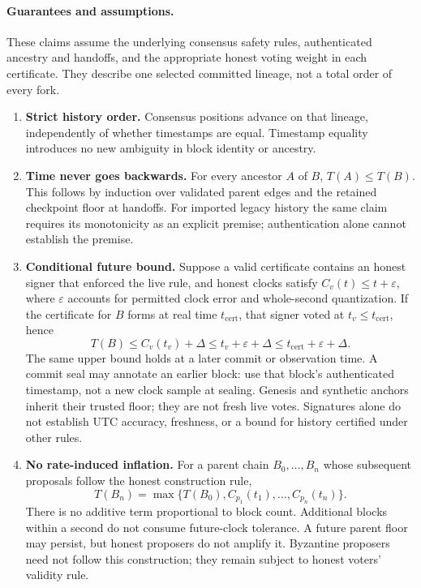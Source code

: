 \paragraph{Guarantees and assumptions.}
These claims assume the underlying consensus safety rules, authenticated ancestry
and handoffs, and the appropriate honest voting weight in each certificate.
They describe one selected committed lineage, not a total order of every fork.
\begin{enumerate}
\item \textbf{Strict history order.} Consensus positions advance on that lineage,
independently of whether timestamps are equal. Timestamp equality introduces no
new ambiguity in block identity or ancestry.
\item \textbf{Time never goes backwards.} For every ancestor $A$ of $B$,
$T(A)\leq T(B)$. This follows by induction over validated parent edges and the
retained checkpoint floor at handoffs. For imported legacy history the same
claim requires its monotonicity as an explicit premise; authentication alone
cannot establish the premise.
\item \textbf{Conditional future bound.} Suppose a valid certificate contains an
honest signer that enforced the live rule, and honest clocks satisfy
$C_v(t)\leq t+\varepsilon$, where $\varepsilon$ accounts for permitted clock error
and whole-second quantization. If the certificate for $B$ forms at real time
$t_{\mathrm{cert}}$, that signer voted at $t_v\leq t_{\mathrm{cert}}$, hence
\[
 T(B)\leq C_v(t_v)+\Delta
       \leq t_v+\varepsilon+\Delta
       \leq t_{\mathrm{cert}}+\varepsilon+\Delta.
\]
The same upper bound holds at a later commit or observation time. A commit seal
may annotate an earlier block: use that block's authenticated timestamp, not a
new clock sample at sealing. Genesis and synthetic anchors inherit their trusted
floor; they are not fresh live votes. Signatures alone do not establish UTC
accuracy, freshness, or a bound for history certified under other rules.
\item \textbf{No rate-induced inflation.} For a parent chain $B_0,\ldots,B_n$
whose subsequent proposals follow the honest construction rule,
\[
 T(B_n)=\max\{T(B_0),C_{p_1}(t_1),\ldots,C_{p_n}(t_n)\}.
\]
There is no additive term proportional to block count. Additional blocks within
a second do not consume future-clock tolerance. A future parent floor may
persist, but honest proposers do not amplify it. Byzantine proposers need not
follow this construction; they remain subject to honest voters' validity rule.
\end{enumerate}

